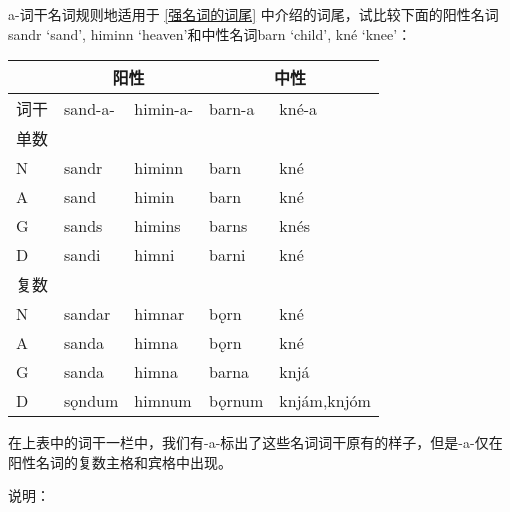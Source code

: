 a-词干名词规则地适用于 \ref{强名词的词尾} 中介绍的词尾，试比较下面的阳性名词sandr
`sand', himinn `heaven'和中性名词barn `child', kné `knee'：

\begin{longtable}{lllll}
  \toprule
       & \multicolumn{2}{c}{\textbf{阳性}} & \multicolumn{2}{c}{\textbf{中性}}                        \\
  \midrule
  \endhead
  \bottomrule
  \endfoot
  词干 & sand-a-                           & himin-a-                          & barn-a & kné-a       \\
  单数 &                                   &                                   &        &             \\
  N    & sandr                             & himinn                            & barn   & kné         \\
  A    & sand                              & himin                             & barn   & kné         \\
  G    & sands                             & himins                            & barns  & knés        \\
  D    & sandi                             & himni                             & barni  & kné         \\
  复数 &                                   &                                   &        &             \\
  N    & sandar                            & himnar                            & bǫrn   & kné         \\
  A    & sanda                             & himna                             & bǫrn   & kné         \\
  G    & sanda                             & himna                             & barna  & knjá        \\
  D    & sǫndum                            & himnum                            & bǫrnum & knjám,knjóm \\
\end{longtable}

在上表中的词干一栏中，我们有-a-标出了这些名词词干原有的样子，但是-a-仅在阳性名词的复数主格和宾格中出现。

说明：

